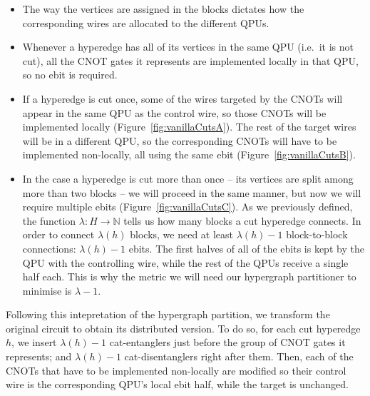 \begin{itemize}

  \item The way the vertices are assigned in the blocks dictates how the corresponding wires are allocated to the different QPUs. 
  \item Whenever a hyperedge has all of its vertices in the same QPU (i.e.\ it is not cut), all the CNOT gates it represents are implemented locally in that QPU, so no ebit is required. 
  \item If a hyperedge is cut once, some of the wires targeted by the CNOTs will appear in the same QPU as the control wire, so those CNOTs will be implemented locally (Figure~\ref{fig:vanillaCutsA}). The rest of the target wires will be in a different QPU, so the corresponding CNOTs will have to be implemented non-locally, all using the same ebit (Figure~\ref{fig:vanillaCutsB}). 
  \item In the case a hyperedge is cut more than once -- its vertices are split among more than two blocks -- we will proceed in the same manner, but now we will require multiple ebits (Figure~\ref{fig:vanillaCutsC}). As we previously defined, the function \(\lambda\colon H \to \mathbb{N}\) tells us how many blocks a cut hyperedge connects. In order to connect \(\lambda(h)\) blocks, we need at least \(\lambda(h)-1\) block-to-block connections: \(\lambda(h)-1\) ebits. The first halves of all of the ebits is kept by the QPU with the controlling wire, while the rest of the QPUs receive a single half each. This is why the metric we will need our hypergraph partitioner to minimise is \(\lambda-1\).
\end{itemize}



Following this intepretation of the hypergraph partition, we transform the original circuit to obtain its distributed version. To do so, for each cut hyperedge \(h\), we insert \(\lambda(h)-1\) cat-entanglers just before the group of CNOT gates it represents; and \(\lambda(h)-1\) cat-disentanglers right after them. Then, each of the CNOTs that have to be implemented non-locally are modified so their control wire is the corresponding QPU's local ebit half, while the target is unchanged.


